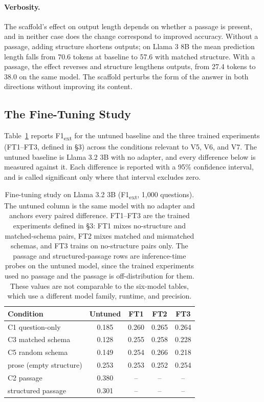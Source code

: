 \documentclass{article}
\begin{document}
\paragraph{Verbosity.}
The scaffold's effect on output length depends on whether a passage is present, and in neither case does the change correspond to improved accuracy. Without a passage, adding structure shortens outputs; on Llama 3 8B the mean prediction length falls from 70.6 tokens at baseline to 57.6 with matched structure. With a passage, the effect reverses and structure lengthens outputs, from 27.4 tokens to 38.0 on the same model. The scaffold perturbs the form of the answer in both directions without improving its content.

\subsection{The Fine-Tuning Study}

Table~\ref{tab:finetune} reports F1\textsubscript{ext} for the untuned baseline and the three trained experiments (FT1--FT3, defined in \S3) across the conditions relevant to V5, V6, and V7. The untuned baseline is Llama 3.2 3B with no adapter, and every difference below is measured against it. Each difference is reported with a 95\% confidence interval, and is called significant only where that interval excludes zero.

\begin{table}[h]
\centering
\begin{tabular}{lcccc}
\toprule
Condition & Untuned & FT1 & FT2 & FT3 \\
\midrule
C1 question-only        & 0.185 & 0.260 & 0.265 & 0.264 \\
C3 matched schema       & 0.128 & 0.255 & 0.258 & 0.228 \\
C5 random schema        & 0.149 & 0.254 & 0.266 & 0.218 \\
prose (empty structure) & 0.253 & 0.253 & 0.252 & 0.254 \\
C2 passage              & 0.380 & --    & --    & --    \\
structured passage      & 0.301 & --    & --    & --    \\
\bottomrule
\end{tabular}
\caption{Fine-tuning study on Llama 3.2 3B (F1\textsubscript{ext}, 1,000 questions). The untuned column is the same model with no adapter and anchors every paired difference. FT1--FT3 are the trained experiments defined in \S3: FT1 mixes no-structure and matched-schema pairs, FT2 mixes matched and mismatched schemas, and FT3 trains on no-structure pairs only. The passage and structured-passage rows are inference-time probes on the untuned model, since the trained experiments used no passage and the passage is off-distribution for them. These values are not comparable to the six-model tables, which use a different model family, runtime, and precision.}
\label{tab:finetune}
\end{table}
\end{document}
